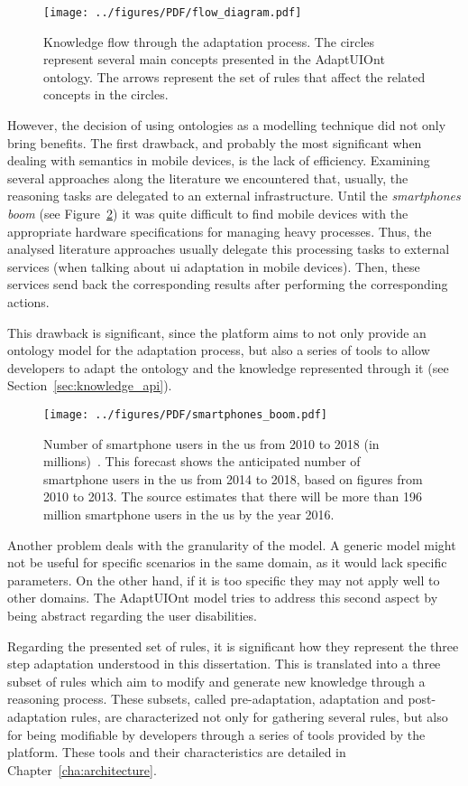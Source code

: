 \begin{figure}
\centering
\texttt{[image: ../figures/PDF/flow\_diagram.pdf]}
\caption{Knowledge flow through the adaptation process. The circles
represent several main concepts presented in the AdaptUIOnt ontology. The arrows
represent the set of rules that affect the related concepts in the circles.}
\label{fig:flow_diagram_2}
\end{figure}

However, the decision of using ontologies as a modelling technique did not only
bring benefits. The first drawback, and probably the most significant when dealing
with semantics in mobile devices, is the lack of efficiency. Examining several
approaches along the literature we encountered that, usually, the reasoning tasks
are delegated to an external infrastructure. Until the \textit{smartphones boom} (see
Figure~\ref{fig:smartphones_boom}) it was quite difficult to find mobile devices
with the appropriate hardware specifications for managing heavy processes. Thus,
the analysed literature approaches usually delegate this processing tasks to
external services (when talking about \acs{ui} adaptation in mobile devices). Then,
these services send back the corresponding results after performing the
corresponding actions. 

This drawback is significant, since the platform aims to not only provide an ontology
model for the adaptation process, but also a series of tools to allow developers
to adapt the ontology and the knowledge represented through it (see 
Section~\ref{sec:knowledge_api}).


\begin{figure}
\centering
\texttt{[image: ../figures/PDF/smartphones\_boom.pdf]}
\caption{Number of smartphone users in the \ac{us} from 2010 to 2018 (in
millions)~\citep{smartphones_boom}. This forecast shows the anticipated number
of smartphone users in the \ac{us} from 2014 to 2018, based on figures from 2010 
to 2013. The source estimates that there will be more than 196 million smartphone
users in the \ac{us} by the year 2016.}
\label{fig:smartphones_boom}
\end{figure}

Another problem deals with the granularity of the model. A generic model might
not be useful for specific scenarios in the same domain, as it would lack specific
parameters. On the other hand, if it is too specific they may not apply well to
other domains. The AdaptUIOnt model tries to address this second aspect by being
abstract regarding the user disabilities. 

Regarding the presented set of rules, it is significant how they represent the
three step adaptation understood in this dissertation. This is translated into a three
subset of rules which aim to modify and generate new knowledge through a reasoning
process. These subsets, called pre-adaptation, adaptation and post-adaptation rules,
are characterized not only for gathering several rules, but also for being modifiable
by developers through a series of tools provided by the platform. These tools and
their characteristics are detailed in Chapter~\ref{cha:architecture}.